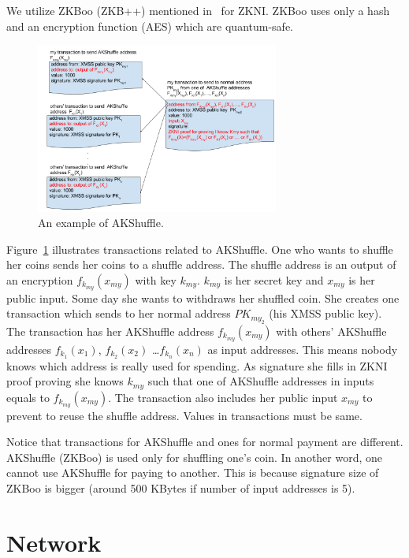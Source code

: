 \documentclass[a4paper,10pt,twocolumn]{article}
\begin{document}
We utilize ZKBoo (ZKB++) mentioned in~\cite{zkb} for ZKNI. ZKBoo uses only a hash and an encryption function (AES) which are quantum-safe.


\begin{figure}[ht]
	\begin{center}
	\includegraphics[width=80mm]{shuffle.png}
	  \caption{An example of AKShuffle.}
    \label{fig:shuffle}
	\end{center}
 \end{figure}

 Figure~\ref{fig:shuffle} illustrates transactions related to AKShuffle. One who wants to shuffle her coins sends her coins to a shuffle address.
 The shuffle address is an output of an encryption \( f_{k_{my}}(x_{my}) \) with key \( k_{my} \). 
 \(k_{my}\) is her secret key  and \(x_{my}\) is her public input.
 Some day she wants to  withdraws her shuffled coin. She creates one transaction which sends to her normal address \(PK_{my_2}\) (his XMSS public key).
 The transaction has her AKShuffle address \( f_{k_{my}}(x_{my}) \) with others' AKShuffle addresses 
\( f_{k_{1}}(x_{1}) \), \( f_{k_{2}}(x_{2}) \) \dots \( f_{k_{n}}(x_{n}) \) as input addresses. 
This means nobody knows which address is really used for spending. As signature she fills in ZKNI proof proving she knows \( k_{my} \) such that 
one of AKShuffle addresses in inputs equals  to \( f_{k_{my}}(x_{my}) \). The transaction also includes her public input \( x_{my} \)
to prevent to reuse the shuffle address. Values in transactions must be same.

Notice that transactions for AKShuffle and ones for normal payment are different. AKShuffle (ZKBoo) is used only for shuffling one's coin.
In another word, one cannot use AKShuffle for paying to another.
This is because signature size of ZKBoo is bigger (around 500 KBytes if number of input addresses is 5).


\section{Network}
\label{sec:network}
\end{document}
